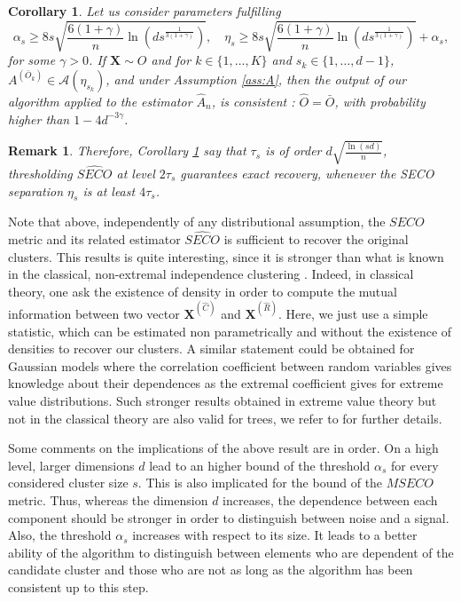 \documentclass[11pt]{article}
\newtheorem{corollary}{Corollary}
\newtheorem{remark}{Remark}
\begin{document}
	\begin{corollary}
		\label{corr:exact_recovery}
		Let us consider parameters fulfilling 
		\begin{equation*}
		\alpha_s \geq 8s \sqrt{\frac{6(1+\gamma)}{n} \ln\left(d s^{\frac{1}{3(1+\gamma)}}\right)}, \quad \eta_{s} \geq 8s \sqrt{\frac{6(1+\gamma)}{n} \ln\left(d s^{\frac{1}{3(1+\gamma)}}\right)} + \alpha_s,
		\end{equation*}
		for some $\gamma > 0$. If $\textbf{X} \sim O$ and for $k \in \{1,\dots, K\}$ and $s_k \in \{1, \dots, d-1\}$, $A^{(\bar{O}_k)} \in \mathcal{A}(\eta_{s_k})$, and under Assumption \ref{ass:A}, then the output of our algorithm applied to the estimator $\hat{A}_n$, is consistent : $\hat{O} = \bar{O}$, with probability higher than $1-4d^{-3\gamma}$.
	\end{corollary}
	
	\begin{remark}
		Therefore, Corollary \ref{corr:exact_recovery} say that $\tau_s$ is of order $d\sqrt{\frac{\ln(sd)}{n}}$, thresholding $\widehat{SECO}$ at level $2\tau_s$ guarantees exact recovery, whenever the SECO separation $\eta_s$ is at least $4 \tau_s$.
	\end{remark}
	Note that above, independently of any distributional assumption, the $SECO$ metric and its related estimator $\widehat{SECO}$ is sufficient to recover the original clusters. This results is quite interesting, since it is stronger than what is known in the classical, non-extremal independence clustering \cite{NIPS2017_37d097ca}. Indeed, in classical theory, one ask the existence of density in order to compute the mutual information between two vector $\textbf{X}^{(\hat{C})}$ and $\textbf{X}^{(\hat{R})}$. Here, we just use a simple statistic, which can be estimated non parametrically and without the existence of densities to recover our clusters. A similar statement could be obtained for Gaussian models where the correlation coefficient between random variables gives knowledge about their dependences as the extremal coefficient gives for extreme value distributions. Such stronger results obtained in extreme value theory but not in the classical theory are also valid for trees, we refer to \cite{engelke2020structure} for further details.
	
	Some comments on the implications of the above result are in order. On a high level, larger dimensions $d$ lead to an higher bound of the threshold $\alpha_s$ for every considered cluster size $s$. This is also implicated for the bound of the $MSECO$ metric. Thus, whereas the dimension $d$ increases, the dependence between each component should be stronger in order to distinguish between noise and a signal. Also, the threshold $\alpha_s$ increases with respect to its size. It leads to a better ability of the algorithm to distinguish between elements who are dependent of the candidate cluster and those who are not as long as the algorithm has been consistent up to this step.
	
    
    
\end{document}
